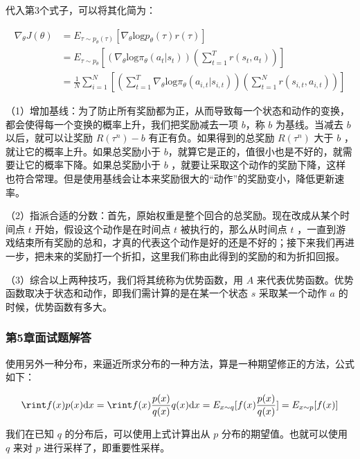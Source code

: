 代入第3个式子，可以将其化简为：

$$
\begin{aligned}
    \nabla_{\theta}J(\theta) 
    &= E_{\tau \sim p_{\theta}(\tau)}[{\nabla}_{\theta}\mathrm{log}p_{\theta}(\tau)r(\tau)] \\
    &= E_{\tau \sim p_{\theta}}[(\nabla_{\theta}\mathrm{log}\pi_{\theta}(a_t|s_t))(\sum_{t=1}^Tr(s_t,a_t))] \\
    &= \frac{1}{N}\sum_{i=1}^N[(\sum_{t=1}^T\nabla_{\theta}\mathrm{log} \pi_{\theta}(a_{i,t}|s_{i,t}))(\sum_{t=1}^Nr(s_{i,t},a_{i,t}))]    
\end{aligned}
$$

  
（1）增加基线：为了防止所有奖励都为正，从而导致每一个状态和动作的变换，都会使得每一个变换的概率上升，我们把奖励减去一项 $b$，称 $b$ 为基线。当减去 $b$ 以后，就可以让奖励 $R(\tau^n)-b$ 有正有负。如果得到的总奖励 $R(\tau^n)$ 大于 $b$ ，就让它的概率上升。如果总奖励小于 $b$，就算它是正的，值很小也是不好的，就需要让它的概率下降。如果总奖励小于 $b$ ，就要让采取这个动作的奖励下降，这样也符合常理。但是使用基线会让本来奖励很大的“动作”的奖励变小，降低更新速率。

（2）指派合适的分数：首先，原始权重是整个回合的总奖励。现在改成从某个时间点 $t$ 开始，假设这个动作是在时间点 $t$ 被执行的，那么从时间点 $t$ ，一直到游戏结束所有奖励的总和，才真的代表这个动作是好的还是不好的；接下来我们再进一步，把未来的奖励打一个折扣，这里我们称由此得到的奖励的和为折扣回报。

（3）综合以上两种技巧，我们将其统称为优势函数，用 $A$ 来代表优势函数。优势函数取决于状态和动作，即我们需计算的是在某一个状态 $s$ 采取某一个动作 $a$ 的时候，优势函数有多大。



\subsubsection*{第5章面试题解答}


使用另外一种分布，来逼近所求分布的一种方法，算是一种期望修正的方法，公式如下：

$$
\rint f(x) p(x) \mathrm{d} x=\rint f(x) \frac{p(x)}{q(x)} q(x) \mathrm{d} x=E_{x \sim q}[f(x){\frac{p(x)}{q(x)}}]=E_{x \sim p}[f(x)]
$$

我们在已知 $q$ 的分布后，可以使用上式计算出从 $p$ 分布的期望值。也就可以使用 $q$ 来对 $p$ 进行采样了，即重要性采样。


